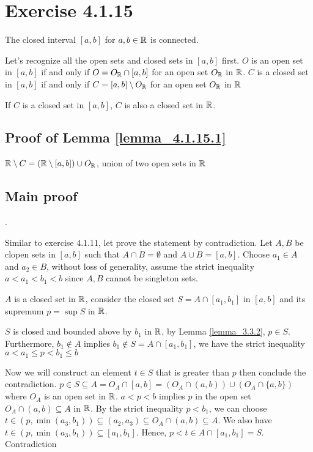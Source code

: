 \documentclass{article}
\begin{document}
\section*{Exercise 4.1.15}

The closed interval $[a, b]$ for $a, b \in \mathbb{R}$ is connected.



Let's recognize all the open sets and closed sets in $[a, b]$ first. $O$ is an open set in $[a, b]$ if and only if $O = O_{\mathbb{R}} \cap [a, b]$ for an open set $O_{\mathbb{R}}$ in $\mathbb{R}$. $C$ is a closed set in $[a, b]$ if and only if $C = [a, b] \setminus O_{\mathbb{R}}$ for an open set $O_{\mathbb{R}}$ in $\mathbb{R}$

\begin{lemma}
    \label{lemma_4.1.15.1}
    If $C$ is a closed set in $[a, b]$, $C$ is also a closed set in $\mathbb{R}$.
\end{lemma}

\subsection*{Proof of Lemma \ref{lemma_4.1.15.1}}

$\mathbb{R} \setminus C = (\mathbb{R} \setminus [a, b]) \cup O_{\mathbb{R}}$, union of two open sets in $\mathbb{R}$

\subsection*{Main proof} .

Similar to exercise 4.1.11, let prove the statement by contradiction. Let $A, B$ be clopen sets in $[a, b]$ such that $A \cap B = \emptyset$ and $A \cup B = [a, b]$. Choose $a_1 \in A$ and $a_2 \in B$, without loss of generality, assume the strict inequality $a < a_1 < b_1 < b$ since $A, B$ cannot be singleton sets.

$A$ is a closed set in $\mathbb{R}$, consider the closed set $S = A \cap [a_1, b_1]$ in $[a, b]$ and its supremum $p = \sup S$ in $\mathbb{R}$.

$S$ is closed and bounded above by $b_1$ in $\mathbb{R}$, by Lemma \ref{lemma_3.3.2}, $p \in S$. Furthermore, $b_1 \notin A$ implies $b_1 \notin S = A \cap [a_1, b_1]$, we have the strict inequality $a < a_1 \leq p < b_1 \leq b$

Now we will construct an element $t \in S$ that is greater than $p$ then conclude the contradiction. $p \in S \subseteq A = O_A \cap [a, b] = (O_A \cap (a, b)) \cup (O_A \cap \{a, b\})$ where $O_A$ is an open set in $\mathbb{R}$. $a < p < b$ implies $p$ in the open set $O_A \cap (a, b) \subseteq A$ in $\mathbb{R}$. By the strict inequality $p < b_1$, we can choose $t \in (p, \min (a_3, b_1)) \subseteq (a_2, a_3) \subseteq O_A \cap (a, b) \subseteq A$. We also have $t \in (p, \min (a_3, b_1)) \subseteq [a_1, b_1]$. Hence, $p < t \in A \cap [a_1, b_1] = S$. Contradiction
\end{document}
